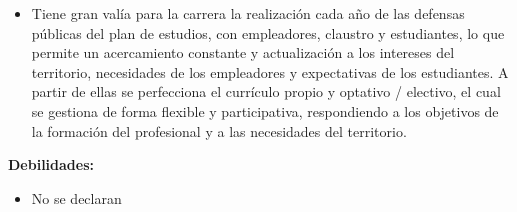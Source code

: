 \begin{itemize}
	\item Tiene gran valía para la carrera la realización cada año de las defensas públicas del plan de estudios, con empleadores, claustro y estudiantes, lo que permite un acercamiento constante y actualización a los intereses del territorio, necesidades de los empleadores y expectativas de los estudiantes. A partir de ellas se perfecciona el currículo propio y optativo / electivo, el cual se gestiona de forma flexible y participativa, respondiendo a los objetivos de la formación del profesional y a las necesidades del territorio.
\end{itemize}


\textbf{Debilidades:}
\begin{itemize}
	\setlength\itemsep{-0.5em}
	\item No se declaran 
\end{itemize}